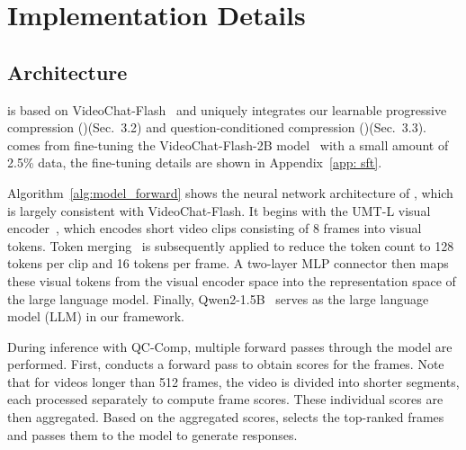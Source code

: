 
\section{Implementation Details}

\subsection{\name Architecture}

\textbf{\name} is based on VideoChat-Flash~\cite{li2024videochat} and uniquely integrates our learnable progressive compression (\textbf{\drop})(Sec.~\textcolor{iccvblue}{3.2}) and question-conditioned compression (\textbf{\segment})(Sec.~\textcolor{iccvblue}{3.3}). \name comes from fine-tuning the VideoChat-Flash-2B model~\cite{li2024videochat} with a small amount of 2.5\% data, the fine-tuning details are shown in Appendix~\ref{app: sft}.

Algorithm~\ref{alg:model_forward} shows the neural network architecture of \name, which is largely consistent with VideoChat-Flash. It begins with the UMT-L visual encoder~\cite{liu2022umt}, which encodes short video clips consisting of 8 frames into visual tokens. Token merging~\cite{bolya2022token} is subsequently applied to reduce the token count to 128 tokens per clip and 16 tokens per frame. A two-layer MLP connector then maps these visual tokens from the visual encoder space into the representation space of the large language model. Finally, Qwen2-1.5B~\cite{bai2025qwen2} serves as the large language model (LLM) in our framework.

During inference with QC-Comp, multiple forward passes through the model are performed. First, \name conducts a forward pass to obtain scores for the frames. Note that for videos longer than 512 frames, the video is divided into shorter segments, each processed separately to compute frame scores. These individual scores are then aggregated. Based on the aggregated scores, \name selects the top-ranked frames and passes them to the model to generate responses.


